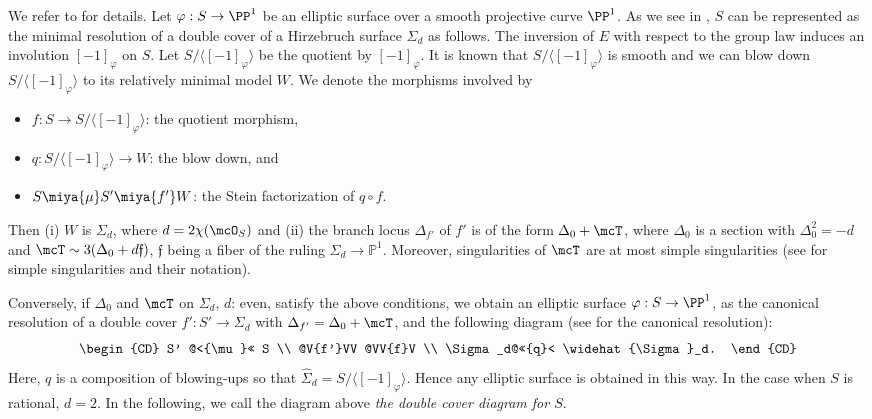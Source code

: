 We refer to \cite[Lectures III and IV]{miranda-basic} for details.
Let $\varphi: S \to \PP^1$ be an elliptic surface over a smooth projective curve $\PP^1$. 
As we see in \cite{bannai-tokunaga, tokunaga14}, $S$ can be represented as the minimal resolution of a double cover of a Hirzebruch surface $\Sigma_d$
as follows. The inversion of $E$ with respect to
the group law  induces an involution $[-1]_{\varphi}$ on $S$. 
Let $S/\langle [-1]_{\varphi}
\rangle$ be the quotient by $[-1]_{\varphi}$.  It is known that  $S/\langle[-1]_{\varphi}\rangle$ 
is smooth and we can  blow down  $S/\langle [-1]_{\varphi} \rangle$ to its relatively minimal
model $W$. We denote the morphisms involved by
      \begin{itemize}
       \item $f: S \to S/\langle [-1]_{\varphi}\rangle$: the quotient morphism, 
       \item $q: S/\langle [-1]_{\varphi}\rangle \to W$: the blow down, and 
      \item $S \miya{{\mu}} S' \miya{{f'}} W$: the Stein factorization of $q\circ f$. 
      \end{itemize}
      Then (i)  $W$ is   $\Sigma_d$, where $d = 2\chi(\mcO_S)$ and (ii)
 the branch locus $\Delta_{f'}$ of $f'$ is of the form $\Delta_0 + \mcT$, where
 $\Delta_0$ is a section with $\Delta_0^2 = -d$ and $\mcT \sim 3(\Delta_0 + d{\mathfrak f})$, 
 ${\mathfrak f}$ being a fiber of the ruling $\Sigma_d \to {\mathbb P}^1$. Moreover, 
 singularities of $\mcT$ are at most simple singularities (see \cite[Chapter II, \S 8]{bpv} for simple singularities and their notation).  
 

Conversely,  if $\Delta_0$ and $\mcT$ on $\Sigma_d$, $d$: even,  satisfy the above conditions, we
obtain an elliptic surface $\varphi : S \to \PP^1$, as the canonical 
resolution of a double cover $f' : S' \to \Sigma_d$ with $\Delta_{f'} = \Delta_0
+ \mcT$, and the following diagram (see \cite{horikawa} for the canonical resolution):
\[
\begin{CD}
S' @<{\mu}<< S \\
@V{f'}VV                 @VV{f}V \\
\Sigma_d@<<{q}< \widehat{\Sigma}_d.
\end{CD}
\]
Here, $q$ is a composition of blowing-ups so that $\widehat{\Sigma}_d
= S/\langle [-1]_{\varphi}\rangle$. 
Hence any elliptic surface  is obtained in this way. In the case when $S$ is rational, $d = 2$.
In the following, we call the diagram above
{\it the double cover diagram for $S$}.


